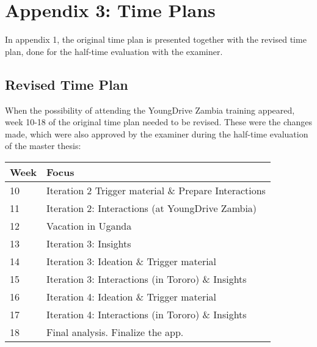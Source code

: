 \chapter{Appendix 3: Time Plans}\label{cha:appendix1}


In appendix 1, the original time plan is presented together with the revised time plan, done for the half-time evaluation with the examiner.



\section{Revised Time Plan}

When the possibility of attending the YoungDrive Zambia training appeared, week 10-18 of the original time plan needed to be revised. These were the changes made, which were also approved by the examiner during the half-time evaluation of the master thesis:

\begin{center}
    \begin{tabular}{ | l | p{10cm} |}
    \hline
    Week & Focus \\ \hline
    10 & Iteration 2 Trigger material \& Prepare Interactions \\ \hline
    11 & Iteration 2: Interactions (at YoungDrive Zambia) \\ \hline
    12 & Vacation in Uganda \\ \hline
    13 & Iteration 3: Insights \\ \hline
    14 & Iteration 3: Ideation \& Trigger material \\ \hline
    15 & Iteration 3: Interactions (in Tororo) \& Insights \\ \hline
    16 & Iteration 4: Ideation \& Trigger material \\ \hline
    17 & Iteration 4: Interactions (in Tororo) \& Insights \\ \hline
    18 & Final analysis. Finalize the app. \\ \hline
    \end{tabular}
\end{center}
